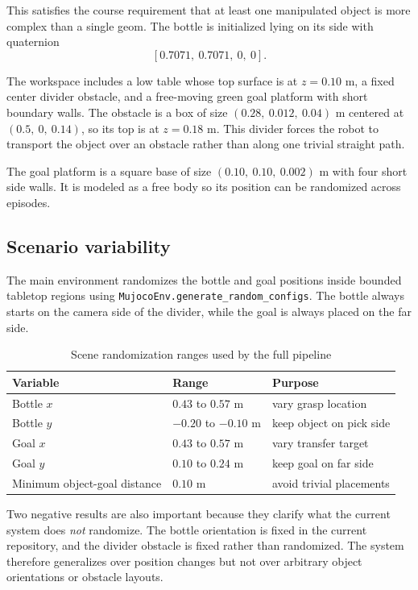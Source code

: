 \documentclass[11pt]{article}
\begin{document}
This satisfies the course requirement that at least one manipulated object is more complex than a single geom. The bottle is initialized lying on its side with quaternion
\[
[0.7071,\ 0.7071,\ 0,\ 0].
\]

The workspace includes a low table whose top surface is at \(z = 0.10\) m, a fixed center divider obstacle, and a free-moving green goal platform with short boundary walls. The obstacle is a box of size \((0.28,\ 0.012,\ 0.04)\) m centered at \((0.5,\ 0,\ 0.14)\), so its top is at \(z = 0.18\) m. This divider forces the robot to transport the object over an obstacle rather than along one trivial straight path.

The goal platform is a square base of size \((0.10,\ 0.10,\ 0.002)\) m with four short side walls. It is modeled as a free body so its position can be randomized across episodes.

\subsection{Scenario variability}

The main environment randomizes the bottle and goal positions inside bounded tabletop regions using \texttt{MujocoEnv.generate\_random\_configs}. The bottle always starts on the camera side of the divider, while the goal is always placed on the far side.

\begin{table}[H]
  \caption{Scene randomization ranges used by the full pipeline}
  \label{tab:randomization}
  \centering
  \begin{tabular}{lll}
    \toprule
    Variable & Range & Purpose \\
    \midrule
    Bottle \(x\) & \(0.43\) to \(0.57\) m & vary grasp location \\
    Bottle \(y\) & \(-0.20\) to \(-0.10\) m & keep object on pick side \\
    Goal \(x\) & \(0.43\) to \(0.57\) m & vary transfer target \\
    Goal \(y\) & \(0.10\) to \(0.24\) m & keep goal on far side \\
    Minimum object-goal distance & \(0.10\) m & avoid trivial placements \\
    \bottomrule
  \end{tabular}
\end{table}

Two negative results are also important because they clarify what the current system does \emph{not} randomize. The bottle orientation is fixed in the current repository, and the divider obstacle is fixed rather than randomized. The system therefore generalizes over position changes but not over arbitrary object orientations or obstacle layouts.
\end{document}
